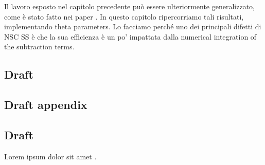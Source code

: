 \documentclass[a4paper, 12pt]{book}
\begin{document}
Il lavoro esposto nel capitolo precedente può essere ulteriormente generalizzato, come è stato fatto nei paper \cite{Devoto:2023rpv,Devoto:2025kin}. In questo capitolo ripercorriamo tali risultati, implementando theta parameters. Lo facciamo perché uno dei principali difetti di NSC SS è che la sua efficienza è un po' impattata dalla numerical integration of the subtraction terms.

\section{Draft}

\clearpage

\begin{appendices}
\pagestyle{append}

\chapter{Draft appendix}

\section{Draft}

Lorem ipsum dolor sit amet \cite{pauli}.

\clearpage
\end{appendices}

\pagestyle{biblio}
\printbibliography[heading = bibintoc, title = {Bibliography}]
\end{document}
